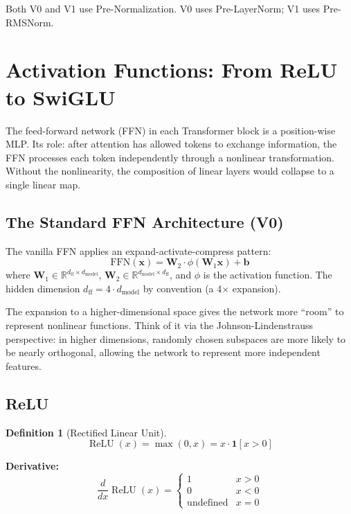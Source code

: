 \documentclass[11pt, a4paper]{article}
\theoremstyle{definition}
\newtheorem{definition}{Definition}[section]
\newcommand{\vx}{\bm{x}}
\newcommand{\mW}{\bm{W}}
\newcommand{\reals}{\mathbb{R}}
\newcommand{\dmodel}{d_{\text{model}}}
\newcommand{\dff}{d_{\text{ff}}}
\DeclareMathOperator{\ReLU}{ReLU}
\begin{document}
Both V0 and V1 use Pre-Normalization. V0 uses Pre-LayerNorm; V1 uses Pre-RMSNorm.

\section{Activation Functions: From ReLU to SwiGLU}

The feed-forward network (FFN) in each Transformer block is a position-wise MLP. Its role: after attention has allowed tokens to exchange information, the FFN processes each token independently through a nonlinear transformation. Without the nonlinearity, the composition of linear layers would collapse to a single linear map.

\subsection{The Standard FFN Architecture (V0)}

The vanilla FFN applies an expand-activate-compress pattern:
\begin{equation}\label{eq:standard_ffn}
    \mathrm{FFN}(\vx) = \mW_2 \cdot \phi(\mW_1 \vx) + \bm{b}
\end{equation}
where $\mW_1 \in \reals^{\dff \times \dmodel}$, $\mW_2 \in \reals^{\dmodel \times \dff}$, and $\phi$ is the activation function. The hidden dimension $\dff = 4 \cdot \dmodel$ by convention (a 4$\times$ expansion).

The expansion to a higher-dimensional space gives the network more ``room'' to represent nonlinear functions. Think of it via the Johnson-Lindenstrauss perspective: in higher dimensions, randomly chosen subspaces are more likely to be nearly orthogonal, allowing the network to represent more independent features.

\subsection{ReLU}

\begin{definition}[Rectified Linear Unit]
\begin{equation}
    \ReLU(x) = \max(0, x) = x \cdot \mathbf{1}[x > 0]
\end{equation}
\end{definition}

\textbf{Derivative:}
\begin{equation}
    \frac{d}{dx}\ReLU(x) = \begin{cases} 1 & x > 0 \\ 0 & x < 0 \\ \text{undefined} & x = 0 \end{cases}
\end{equation}
\end{document}
